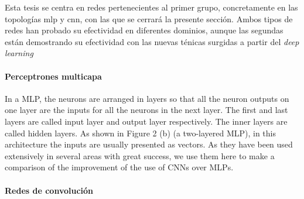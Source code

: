 Esta tesis se centra en redes pertenecientes al primer grupo, concretamente en las topologías \gls{mlp} y \gls{cnn}, con las que se cerrará la presente sección. Ambos tipos de redes han probado su efectividad en diferentes dominios, aunque las segundas están demostrando su efectividad con las nuevas ténicas surgidas a partir del \textit{deep learning}






\paragraph{Perceptrones multicapa}

In a MLP, the neurons are arranged in layers so that all the neuron outputs on one layer are the inputs for all the neurons in the next layer. The first and last layers are called input layer and output layer respectively. The inner layers are called hidden layers. As shown in Figure 2 (b) (a two-layered MLP), in this architecture the inputs are usually presented as vectors. As they have been used extensively in several areas with great success, we use them here to make a comparison of the improvement of the use of CNNs over MLPs.


\paragraph{Redes de convolución}

